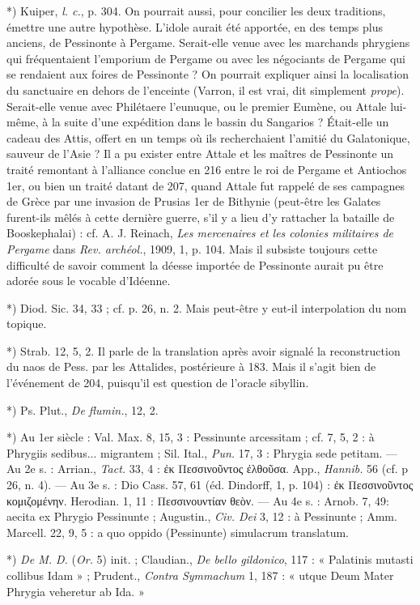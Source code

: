 \documentclass[a4paper, 11pt, oneside, polutonikogreek, french]{article}
\begin{document}
*) Kuiper, \emph{l. c.}, p. 304. On pourrait aussi, pour concilier les deux traditions, émettre une autre hypothèse. L'idole aurait été apportée, en des temps plus anciens, de Pessinonte à Pergame. Serait-elle venue avec les marchands phrygiens qui fréquentaient l'emporium de Pergame ou avec les négociants de Pergame qui se rendaient aux foires de Pessinonte ? On pourrait expliquer ainsi la localisation du sanctuaire en dehors de l'enceinte (Varron, il est vrai, dit simplement \emph{prope}). Serait-elle venue avec Philétaere l'eunuque, ou le premier Eumène, ou Attale lui-même, à la suite d'une expédition dans le bassin du Sangarios ? Était-elle un cadeau des Attis, offert en un temps où ils recherchaient l'amitié du Galatonique, sauveur de l'Asie ? Il a pu exister entre Attale et les maîtres de Pessinonte un traité remontant à l'alliance conclue en 216 entre le roi de Pergame et Antiochos 1er, ou bien un traité datant de 207, quand Attale fut rappelé de ses campagnes de Grèce par une invasion de Prusias 1er de Bithynie (peut-être les Galates furent-ils mêlés à cette dernière guerre, s'il y a lieu d'y rattacher la bataille de Booskephalai) : cf. A. J. Reinach, \emph{Les mercenaires et les colonies militaires de Pergame} dans \emph{Rev. archéol.}, 1909, 1, p. 104. Mais il subsiste toujours cette difficulté de savoir comment la déesse importée de Pessinonte aurait pu être adorée sous le vocable d'Idéenne.

*) Diod. Sic. 34, 33 ; cf. p. 26, n. 2. Mais peut-être y eut-il interpolation du nom topique.

*) Strab. 12, 5, 2. Il parle de la translation après avoir signalé la reconstruction du naos de Pess. par les Attalides, postérieure à 183. Mais il s'agit bien de l'événement de 204, puisqu'il est question de l'oracle sibyllin.

*) Ps. Plut., \emph{De flumin.}, 12, 2.

*) Au 1er siècle : Val. Max. 8, 15, 3 : Pessinunte arcessitam ; cf. 7, 5, 2 : à Phrygiis sedibus... migrantem ; Sil. Ital., \emph{Pun.} 17, 3 : Phrygia sede petitam. --- Au 2e s. : Arrian., \emph{Tact.} 33, 4 : ἐκ Πεσσινοῦντος ἐλθοῦσα. App., \emph{Hannib.} 56 (cf. p 26, n. 4). --- Au 3e s. : Dio Cass. 57, 61 (éd. Dindorff, 1, p. 104) : ἐκ Πεσσινοῦντος κομιζομένην. Herodian. 1, 11 : Πεσσινουντίαν θεὸν. --- Au 4e s. : Arnob. 7, 49: aecita ex Phrygio Pessinunte ; Augustin., \emph{Civ. Dei} 3, 12 : à Pessinunte ; Amm. Marcell. 22, 9, 5 : a quo oppido (Pessinunte) simulacrum translatum.

*) \emph{De M. D.} (\emph{Or.} 5) init. ; Claudian., \emph{De bello gildonico}, 117 : « Palatinis mutasti collibus Idam » ; Prudent., \emph{Contra Symmachum} 1, 187 : « utque Deum Mater Phrygia veheretur ab Ida. »
\end{document}
